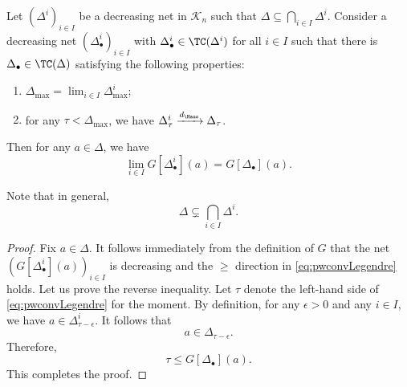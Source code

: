 \begin{proposition}\label{prop:decnetLegend}
    Let $(\Delta^i)_{i\in I}$ be a decreasing net in $\mathcal{K}_n$ such that $\Delta\subseteq \bigcap_{i\in I}\Delta^i$. Consider a decreasing net $(\Delta^i_{\bullet})_{i\in I}$ with $\Delta^i_{\bullet}\in \TC(\Delta^i)$ for all $i\in I$ such that there is $\Delta_{\bullet}\in \TC(\Delta)$ satisfying the following properties:
    \begin{enumerate}
        \item\label{itm:prop:decnetLegend:1} $\Delta_{\max}= \lim_{i\in I}\Delta^i_{\max}$;
        \item\label{itm:prop:decnetLegend:2} for any $\tau<\Delta_{\max}$, we have $\Delta^i_{\tau}\xrightarrow{d_{\Haus}}\Delta_{\tau}$.
    \end{enumerate}
    Then for any $a\in \Delta$, we have
    \begin{equation}\label{eq:pwconvLegendre}
        \lim_{i\in I} G[\Delta^i_{\bullet}](a)=G[\Delta_{\bullet}](a).
    \end{equation}
\end{proposition}
Note that in general,
\[
\Delta\subsetneq \bigcap_{i\in I}\Delta^i.
\]
\begin{proof}
Fix $a\in \Delta$.
    It follows immediately from the definition of $G$ that the net $(G[\Delta^i_{\bullet}](a))_{i\in I}$ is decreasing and the $\geq$ direction in \eqref{eq:pwconvLegendre} holds. Let us prove the reverse inequality. Let $\tau$ denote the left-hand side of \eqref{eq:pwconvLegendre} for the moment. By definition, for any $\epsilon>0$ and any $i\in I$, we have $a\in \Delta^i_{\tau-\epsilon}$.
    It follows that
    \[
    a\in \Delta_{\tau-\epsilon}.
    \]
    Therefore,
    \[
    \tau\leq G[\Delta_{\bullet}](a).
    \]
    This completes the proof.
\end{proof}

